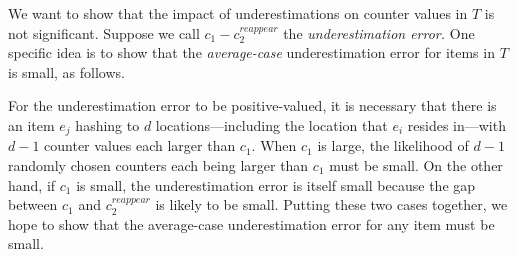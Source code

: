 \documentclass[10pt]{article}
\begin{document}
 We want to show that the impact of
underestimations on counter values in $T$ is not significant. Suppose we call
$c_1 - c_2^{reappear}$ the {\em underestimation error.} One specific idea is to
show that the {\em average-case} underestimation error for items in $T$ is
small, as follows.

For the underestimation error to be positive-valued, it is necessary that there
is an item $e_j$ hashing to $d$ locations---including the location that $e_i$
resides in---with $d-1$ counter values each larger than $c_1$. When $c_1$ is
large, the likelihood of $d-1$ randomly chosen counters each being larger than
$c_1$ must be small. On the other hand, if $c_1$ is small, the underestimation
error is itself small because the gap between $c_1$ and $c_2^{reappear}$ is
likely to be small. Putting these two cases together, we hope to show that the
average-case underestimation error for any item must be small.
\end{document}
